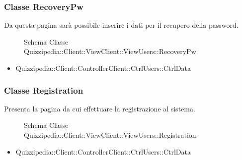 \subsubsection{Classe RecoveryPw}
Da questa pagina sarà possibile inserire i dati per il recupero della password.
\begin{figure}[H]
\centering
\noindent{}
\caption{Schema Classe Quizzipedia::Client::ViewClient::ViewUsers::RecoveryPw}
\end{figure}
\begin{itemize}
\item Quizzipedia::Client::ControllerClient::CtrlUsers::CtrlData
\end{itemize}
\subsubsection{Classe Registration}
Presenta la pagina da cui effettuare la  registrazione al sistema.
\begin{figure}[H]
\centering
\noindent{}
\caption{Schema Classe Quizzipedia::Client::ViewClient::ViewUsers::Registration}
\end{figure}
\begin{itemize}
\item Quizzipedia::Client::ControllerClient::CtrlUsers::CtrlData
\end{itemize}
